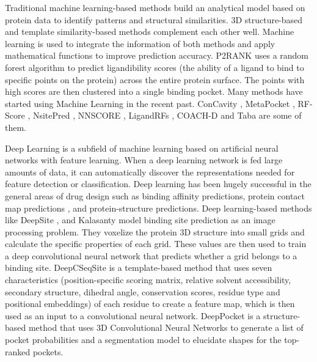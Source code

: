 \documentclass[journal=jcisd8,manuscript=article]{achemso}
\begin{document}
Traditional machine learning-based methods build an analytical model based on protein data to identify patterns and structural similarities. 3D structure-based and template similarity-based methods complement each other well. Machine learning is used to integrate the information of both methods and apply mathematical functions to improve prediction accuracy. P2RANK \cite{krivak2015improving} \cite{krivak2018p2rank} uses a random forest algorithm to predict ligandibility scores (the ability of a ligand to bind to specific points on the protein) across the entire protein surface. The points with high scores are then clustered into a single binding pocket. Many methods have started using Machine Learning in the recent past. ConCavity \cite{capra2009predicting}, MetaPocket \cite{huang2009metapocket}, RF-Score \cite{ballester2010machine}, NsitePred \cite{chen2012prediction}, NNSCORE \cite{durrant2010nnscore} \cite{durrant2011nnscore}, LigandRFs \cite{chen2014ligandrfs}, COACH-D \cite{wu2018coach} and Taba \cite{da2020taba} are some of them.

Deep Learning is a subfield of machine learning based on artificial neural networks with feature learning. When a deep learning network is fed large amounts of data, it can automatically discover the representations needed for feature detection or classification. Deep learning has been hugely successful in the general areas of drug design such as binding affinity predictions\cite{jimenez2018k,ozturk2018deepdta}, protein contact map predictions \cite{hanson2018accurate,wang2017accurate}, and protein-structure predictions\cite{senior2020improved,li2019ensembling,tiwari2020network}. Deep learning-based methods like DeepSite \cite{jimenez2017deepsite}, and Kalasanty \cite{stepniewska2020improving} model binding site prediction as an image processing problem. They voxelize the protein 3D structure into small grids and calculate the specific properties of each grid. These values are then used to train a deep convolutional neural network that predicts whether a grid belongs to a binding site. DeepCSeqSite \cite{cui2019predicting} is a template-based method that uses seven characteristics (position-specific scoring matrix, relative solvent accessibility, secondary structure, dihedral angle, conservation scores, residue type and positional embeddings) of each residue to create a feature map, which is then used as an input to a convolutional neural network. DeepPocket \cite{aggarwal2021deeppocket} is a structure-based method that uses 3D Convolutional Neural Networks to generate a list of pocket probabilities and a segmentation model to elucidate shapes for the top-ranked pockets.
\end{document}
